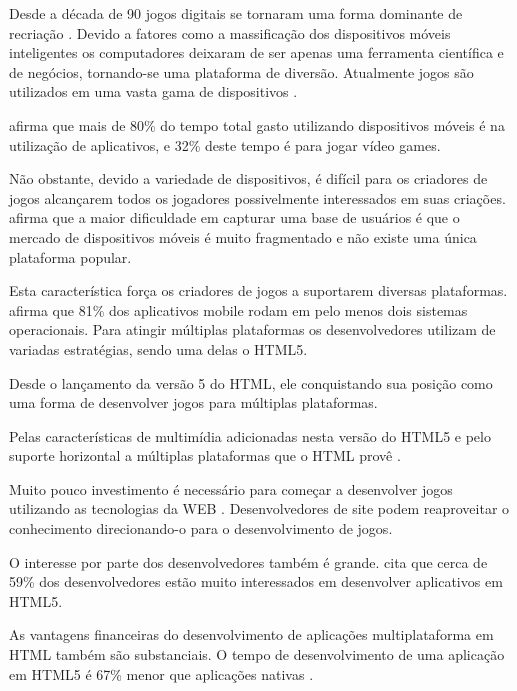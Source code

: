 
Desde a década de 90 jogos digitais se tornaram uma forma dominante
de recriação \autocite{gameDesignPatterns}. Devido a fatores
como a massificação dos dispositivos móveis inteligentes os
computadores deixaram de ser apenas uma ferramenta científica
e de negócios, tornando-se uma plataforma de diversão. Atualmente jogos
são utilizados em uma vasta gama de dispositivos \autocite[pp.
6]{crossPlatformMobileGameDevelopment}.

\autocite{HTML5CrossPlatformGameDevelopment} afirma que mais de 80\% do
tempo total gasto utilizando dispositivos móveis é na utilização de
aplicativos, e 32\% deste tempo é para jogar vídeo games.

Não obstante, devido a variedade de dispositivos, é difícil para
os criadores de jogos alcançarem todos os jogadores possivelmente
interessados em suas criações. \cite{html5Tradeoffs} afirma que a
maior dificuldade em capturar uma base de usuários é que o mercado
de dispositivos móveis é muito fragmentado e não existe uma única
plataforma popular.

Esta característica força os criadores de jogos a suportarem diversas
plataformas. \autocite{htmlSurvey} afirma que 81\% dos aplicativos mobile rodam em
pelo menos dois sistemas operacionais.
Para atingir múltiplas plataformas os desenvolvedores utilizam de variadas estratégias, 
sendo uma delas o HTML5.

Desde o lançamento da versão 5 do HTML, ele conquistando sua posição
como uma forma de desenvolver jogos para múltiplas plataformas.

Pelas características de multimídia adicionadas nesta
versão do HTML5 e pelo suporte horizontal a múltiplas plataformas que o
HTML provê \autocite{html5Tradeoffs}.

Muito pouco investimento é necessário para começar a desenvolver
jogos utilizando as tecnologias da WEB \autocite{html5mostwanted}.
Desenvolvedores de site podem reaproveitar o conhecimento direcionando-o
para o desenvolvimento de jogos. 

O interesse por parte dos desenvolvedores também é grande.
\autocite{htmlSurvey} cita que cerca de 59\% dos desenvolvedores estão
muito interessados em desenvolver aplicativos em HTML5.

As vantagens financeiras do desenvolvimento de aplicações multiplataforma
em HTML também são substanciais. O tempo de desenvolvimento de
uma aplicação em HTML5 é 67\% menor que aplicações nativas
\autocite[pp. 460]{html5Tradeoffs}. 


